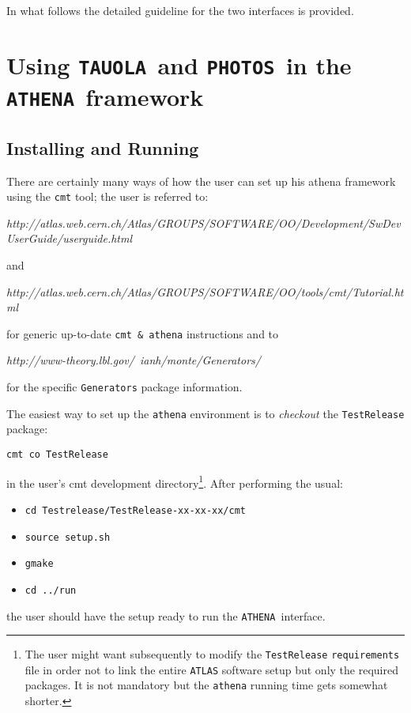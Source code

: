 \documentclass[a4paper,12pt]{article}
\newcommand{\athena}{{\tt ATHENA }}
\newcommand{\tauola}{{\tt TAUOLA }}
\newcommand{\photos}{{\tt PHOTOS }}
\begin{document}
In what follows the detailed guideline for the two interfaces is provided.

\boldmath
\section{Using \tauola and \photos in the \athena framework}
\unboldmath
\enlargethispage{0.8cm}

\boldmath 
\subsection{Installing and Running}
\unboldmath

There are certainly many ways of how the user can set up his athena framework
using the {\tt cmt} tool; the user is referred to:
\begin{center}
{\it http://atlas.web.cern.ch/Atlas/GROUPS/SOFTWARE/OO/Development/SwDevUserGuide/userguide.html}
\end{center}
and 
\begin{center}
{\it http://atlas.web.cern.ch/Atlas/GROUPS/SOFTWARE/OO/tools/cmt/Tutorial.html}
\end{center}
for generic up-to-date {\tt cmt \& athena} instructions and to
\begin{center}
{\it http://www-theory.lbl.gov/~ianh/monte/Generators/}
\end{center}
for the specific {\tt Generators} package information.

The easiest way to set up the {\tt athena} environment is to {\it checkout} the
{\tt TestRelease} package:
\begin{center}
{\tt cmt co TestRelease}
\end{center}
in the user's cmt development directory\footnote{The user might want subsequently to
modify the {\tt TestRelease} {\tt requirements} file in order not to link the
entire {\tt ATLAS} software setup but only the required packages. It is not
mandatory but the {\tt athena} running time gets somewhat shorter.}. After
performing the usual:
\begin{itemize}
\item {\tt cd Testrelease/TestRelease-xx-xx-xx/cmt}
\item {\tt source setup.sh}
\item {\tt gmake}
\item {\tt cd ../run}
\end{itemize}
the user should have the setup ready to run the \athena interface.
\newpage
\end{document}
